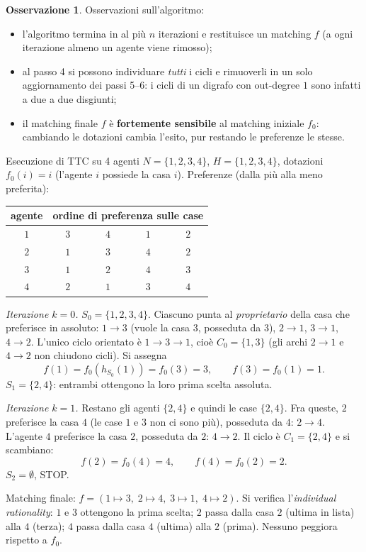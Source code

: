 \documentclass[12pt,a4paper,twoside]{book}
\theoremstyle{plain}
\theoremstyle{definition}
\newtheorem{remark}[theorem]{Osservazione}
\begin{document}
\begin{remark}
Osservazioni sull'algoritmo:
\begin{itemize}
  \item l'algoritmo termina in al più $n$ iterazioni e restituisce un matching $f$ (a ogni iterazione almeno un agente viene rimosso);
  \item al passo 4 si possono individuare \emph{tutti} i cicli e rimuoverli in un solo aggiornamento dei passi 5--6: i cicli di un digrafo con out-degree $1$ sono infatti a due a due disgiunti;
  \item il matching finale $f$ è \textbf{fortemente sensibile} al matching iniziale $f_0$: cambiando le dotazioni cambia l'esito, pur restando le preferenze le stesse.
\end{itemize}
\end{remark}

\begin{exbox}{Esecuzione di TTC su 4 agenti}
$N=\{1,2,3,4\}$, $H=\{1,2,3,4\}$, dotazioni $f_0(i)=i$ (l'agente $i$ possiede la casa $i$). Preferenze (dalla più alla meno preferita):
\begin{center}
\begin{tabular}{c|cccc}
\toprule
agente & \multicolumn{4}{c}{ordine di preferenza sulle case}\\
\midrule
$1$ & $3$ & $4$ & $1$ & $2$\\
$2$ & $1$ & $3$ & $4$ & $2$\\
$3$ & $1$ & $2$ & $4$ & $3$\\
$4$ & $2$ & $1$ & $3$ & $4$\\
\bottomrule
\end{tabular}
\end{center}

\emph{Iterazione $k=0$.} $S_0=\{1,2,3,4\}$. Ciascuno punta al \emph{proprietario} della casa che preferisce in assoluto:
$1\to 3$ (vuole la casa $3$, posseduta da $3$), $2\to 1$, $3\to 1$, $4\to 2$. L'unico ciclo orientato è $1\to 3\to 1$, cioè $C_0=\{1,3\}$ (gli archi $2\to1$ e $4\to2$ non chiudono cicli). Si assegna
\[ f(1)=f_0(h_{S_0}(1))=f_0(3)=3,\qquad f(3)=f_0(1)=1. \]
$S_1=\{2,4\}$: entrambi ottengono la loro prima scelta assoluta.

\emph{Iterazione $k=1$.} Restano gli agenti $\{2,4\}$ e quindi le case $\{2,4\}$. Fra queste, $2$ preferisce la casa $4$ (le case $1$ e $3$ non ci sono più), posseduta da $4$: $2\to 4$. L'agente $4$ preferisce la casa $2$, posseduta da $2$: $4\to 2$. Il ciclo è $C_1=\{2,4\}$ e si scambiano:
\[ f(2)=f_0(4)=4,\qquad f(4)=f_0(2)=2. \]
$S_2=\emptyset$, STOP.

Matching finale: $f=(1\mapsto 3,\;2\mapsto 4,\;3\mapsto 1,\;4\mapsto 2)$. Si verifica l'\emph{individual rationality}: $1$ e $3$ ottengono la prima scelta; $2$ passa dalla casa $2$ (ultima in lista) alla $4$ (terza); $4$ passa dalla casa $4$ (ultima) alla $2$ (prima). Nessuno peggiora rispetto a $f_0$.
\end{exbox}
\end{document}
